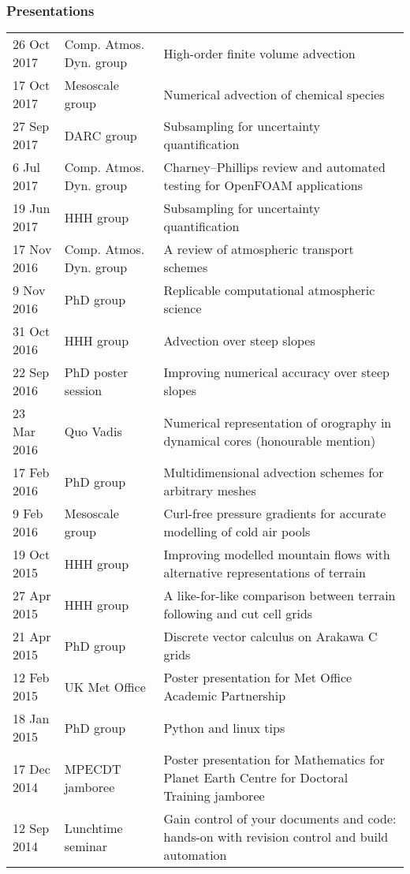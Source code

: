 \documentclass[a4paper,11pt]{article}
\begin{document}
\subsubsection*{Presentations}
\begin{tabularx}{\linewidth}{l l X}
26 Oct 2017 & Comp. Atmos. Dyn. group & High-order finite volume advection \\
17 Oct 2017 & Mesoscale group & Numerical advection of chemical species \\
27 Sep 2017 & DARC group & Subsampling for uncertainty quantification \\
6 Jul 2017 & Comp. Atmos. Dyn. group & Charney--Phillips review and automated testing for OpenFOAM applications \\
19 Jun 2017 & HHH group & Subsampling for uncertainty quantification \\
17 Nov 2016 & Comp. Atmos. Dyn. group & A review of atmospheric transport schemes \\
9 Nov 2016 & PhD group & Replicable computational atmospheric science \\
31 Oct 2016 & HHH group & Advection over steep slopes \\
22 Sep 2016 & PhD poster session & Improving numerical accuracy over steep slopes \\
23 Mar 2016 & Quo Vadis & Numerical representation of orography in dynamical cores (honourable mention) \\
17 Feb 2016 & PhD group & Multidimensional advection schemes for arbitrary meshes \\
9 Feb 2016 & Mesoscale group & Curl-free pressure gradients for accurate modelling of cold air pools \\
19 Oct 2015 & HHH group & Improving modelled mountain flows with alternative representations of terrain \\
27 Apr 2015 & HHH group & A like-for-like comparison between terrain following and cut cell grids \\
21 Apr 2015 & PhD group & Discrete vector calculus on Arakawa C grids \\
12 Feb 2015 & UK Met Office & Poster presentation for Met Office Academic Partnership \\
18 Jan 2015 & PhD group & Python and linux tips \\
17 Dec 2014 & MPECDT jamboree & Poster presentation for Mathematics for Planet Earth Centre for Doctoral Training jamboree \\
12 Sep 2014 & Lunchtime seminar  & Gain control of your documents and code: hands-on with revision control and build automation \\
\end{tabularx}
\end{document}
